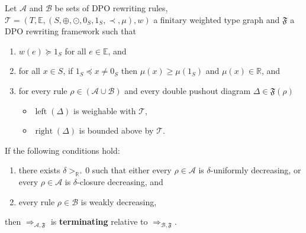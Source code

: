 \begin{theorem} 
    \label{nwf:thm:termination_grs}
    Let $\mathcal{A}$ and $\mathcal{B}$ be sets of DPO rewriting rules, $\mathcal{T} = (T,\mathbb{E}, (S, \oplus, \odot, 0_S, 1_S, \prec, \mu), w)$ a finitary weighted type graph and $\mathfrak{F}$ a DPO rewriting framework such that

     \begin{enumerate}[label=\roman*)]
        \item\label{thm1:hyp3} $w(e) \succeq 1_S$ for all $e \in \mathbb{E}$, and
        \item\label{thm1:hyp4} for all $x \in S$, if $ 1_S \preceq x \neq 0_S$ then $\mu(x) \geq \mu(1_S)$ and $\mu(x) \in \mathbb{R}$, and
        \item for every rule $\rho \in (\mathcal{A }\cup \mathcal{B })$ and every double pushout diagram  
        $\Delta \in \mathfrak{F}(\rho)$ 
        \begin{itemize}
            \item \(\operatorname{left}(\Delta)\) is weighable with \(\mathcal{T}\),
            \item \(\operatorname{right}(\Delta)\) is bounded above by \(\mathcal{T}\). 
        \end{itemize}
    \end{enumerate}       

    \noindent If the following conditions hold:
    \begin{enumerate}
        \item there exists $\delta >_{\mathbb{R}^+} 0$ such that either every $\rho \in \mathcal{A}$ is $\delta$-uniformly decreasing, or every $\rho \in \mathcal{A}$ is $\delta$-closure decreasing, and
        \item every rule $\rho \in \mathcal{B}$ is weakly decreasing,
    \end{enumerate}
    then $\Rightarrow_{\mathcal{A},\mathfrak{F}}$ is \textbf{terminating} relative to $\Rightarrow_{\mathcal{B},\mathfrak{F}}$.
\end{theorem} 

